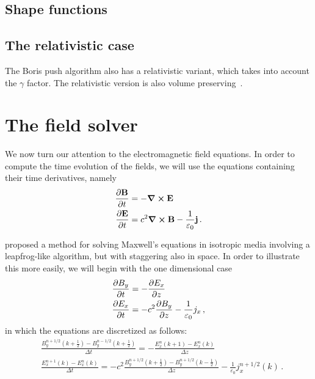 \documentclass[12pt, class=report, crop=false]{standalone}
\begin{document}
\subsection{Shape functions}

\subsection{The relativistic case}

The Boris push algorithm also has a relativistic variant, which takes into account
the \(\gamma\) factor. The relativistic version is also volume
preserving~\autocite{higuera_structurepreservingsecondorder_2017}.

\section{The field solver}

We now turn our attention to the electromagnetic field equations. In order to
compute the time evolution of the fields, we will use the equations containing
their time derivatives, namely
\begin{align}
  \pdv{\vb{B}}{t} & = - \curl{\vb{E}} \label{eq:faraday-law-for-yee} \\
  \pdv{\vb{E}}{t} & = c^2 \curl{\vb{B}} - \frac{1}{\varepsilon_0} \vb{j} \label{eq:ampere-law-for-yee}\,.
\end{align}

\Textcite{kaneyee_numericalsolution_1966} proposed a method for solving Maxwell's
equations in isotropic media involving a leapfrog-like algorithm, but with
staggering also in space. In order to illustrate this more easily, we will begin
with the one dimensional case
\begin{align*}
  \pdv{B_y}{t} & = - \pdv{E_x}{z} \\
  \pdv{E_x}{t} & = -c^2 \pdv{B_y}{z} - \frac{1}{\varepsilon_0} j_x \,,
\end{align*}
in which the equations are discretized as follows:
\begin{subequations}%
\label{eq:yee-1d}
\begin{align}
    &\frac{B_y^{n+1/2}(k+\frac{1}{2}) - B_y^{n-1/2}(k+\frac{1}{2})}{\Delta t} =
    - \frac{E_x^n(k+1) - E_x^n(k)}{\Delta z} \label{eq:yee-1d-faraday} \\
    &\frac{E_x^{n+1}(k) - E_x^{n}(k)}{\Delta t} =
    -c^2 \frac{B_y^{n+1/2}(k+\frac{1}{2}) - B_y^{n+1/2}(k-\frac{1}{2})}{\Delta z}
    -\frac{1}{\varepsilon_0} j_x^{n+1/2}(k) \label{eq:yee-1d-ampere} \,.
\end{align}
\end{subequations}
\end{document}
